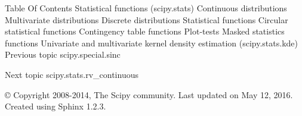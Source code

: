 Table Of Contents
Statistical functions (scipy.stats)
Continuous distributions
Multivariate distributions
Discrete distributions
Statistical functions
Circular statistical functions
Contingency table functions
Plot-tests
Masked statistics functions
Univariate and multivariate kernel density estimation (scipy.stats.kde)
Previous topic
scipy.special.sinc

Next topic
scipy.stats.rv_continuous

© Copyright 2008-2014, The Scipy community.  Last updated on May 12, 2016.  Created using Sphinx 1.2.3.
